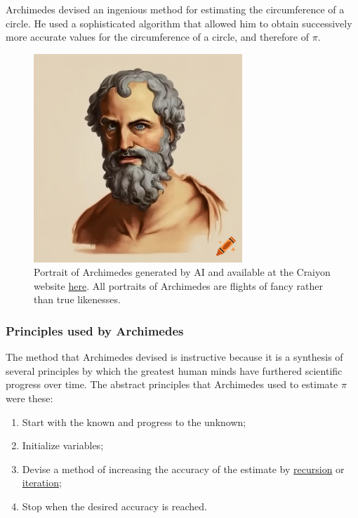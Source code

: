 \documentclass[
  a4paper,
]{article}
\begin{document}
Archimedes devised an ingenious method for estimating the circumference
of a circle. He used a sophisticated algorithm that allowed him to
obtain successively more accurate values for the circumference of a
circle, and therefore of \(\pi\).

\begin{figure}
\centering
\includegraphics[width=0.7\textwidth,height=\textheight]{images/Archimedes-AI-generated-portrait.png}
\caption{Portrait of Archimedes generated by AI and available at the
Craiyon website
\href{https://www.craiyon.com/image/JEmP4rPCRW25xyCULOeMSw}{here}. All
portraits of Archimedes are flights of fancy rather than true
likenesses.}\label{fig:Archimedes-AI}
\end{figure}

\subsubsection{Principles used by
Archimedes}\label{principles-used-by-archimedes}

The method that Archimedes devised is instructive because it is a
synthesis of several principles by which the greatest human minds have
furthered scientific progress over time. The abstract principles that
Archimedes used to estimate \(\pi\) were these:

\begin{enumerate}
\item
  Start with the known and progress to the unknown;
\item
  Initialize variables;
\item
  Devise a method of increasing the accuracy of the estimate by
  \href{https://mathworld.wolfram.com/Recursion.html}{recursion} or
  \href{https://www.vocabulary.com/dictionary/iteration}{iteration};
\item
  Stop when the desired accuracy is reached.
\end{enumerate}
\end{document}
